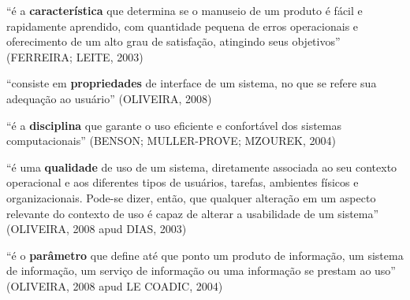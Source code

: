 	{\raggedleft
	\hspace*{4.5cm} 
	\begin{minipage}{0.7\textwidth} 
		“é a \textbf{característica} que determina se o manuseio de um produto é fácil e rapidamente aprendido, com quantidade pequena de erros operacionais e oferecimento de um alto grau de satisfação, atingindo seus objetivos” (FERREIRA; LEITE, 2003) \newline	 	
	\end{minipage}
	\par}

	{\raggedleft
	\hspace*{4.5cm} 
	\begin{minipage}{0.7\textwidth} 
		“consiste em \textbf{propriedades} de interface de um sistema, no que se refere sua adequação ao usuário” (OLIVEIRA, 2008)\newline		 	
	\end{minipage}
	\par}

	{\raggedleft
	\hspace*{4.5cm} 
	\begin{minipage}{0.7\textwidth} 
		“é a \textbf{disciplina} que garante o uso eficiente e confortável dos sistemas computacionais” (BENSON; MULLER-PROVE; MZOUREK, 2004) \newline
	\end{minipage}
	\par}

	{\raggedleft
	\hspace*{4.5cm} 
	\begin{minipage}{0.7\textwidth} 
		“é uma \textbf{qualidade} de uso de um sistema, diretamente associada ao seu contexto operacional e aos diferentes tipos de usuários, tarefas, ambientes físicos e organizacionais. Pode-se dizer, então, que	qualquer alteração em um aspecto relevante do contexto de uso é capaz de alterar a usabilidade de um sistema” (OLIVEIRA, 2008 apud DIAS, 2003)	\newline	 	
	\end{minipage}
	\par}

	{\raggedleft
	\hspace*{4.5cm} 
	\begin{minipage}{0.7\textwidth} 
		“é o \textbf{parâmetro} que define até que ponto um produto de informação, um sistema de informação, um serviço de informação ou uma informação se prestam ao uso” (OLIVEIRA, 2008 apud LE COADIC, 2004) \newline 	
	\end{minipage}
	\par}


